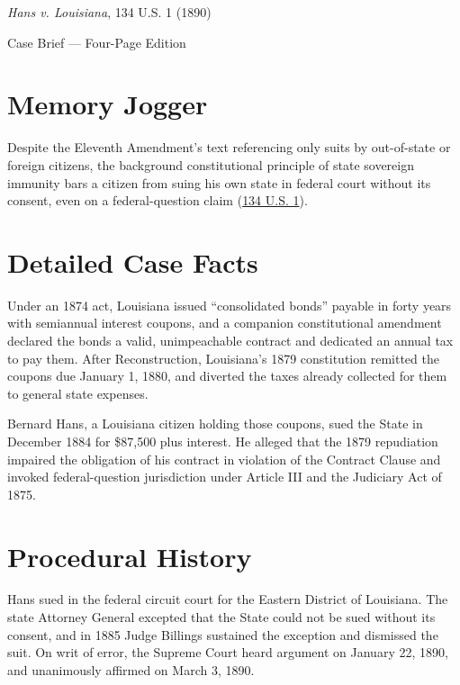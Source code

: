 \documentclass[12pt]{article}
\begin{document}
\begin{center}
{\LARGE \textit{Hans v. Louisiana}, 134 U.S. 1 (1890)\par}
\vspace{0.8em}
{\large Case Brief --- Four-Page Edition\par}
\end{center}
\vspace{1em}

\section{Memory Jogger}

Despite the Eleventh Amendment's text referencing only suits by out-of-state or foreign citizens, the background constitutional principle of state sovereign immunity bars a citizen from suing his own state in federal court without its consent, even on a federal-question claim (\href{https://supreme.justia.com/cases/federal/us/134/1/}{134 U.S. 1}).

\section{Detailed Case Facts}

Under an 1874 act, Louisiana issued ``consolidated bonds'' payable in forty years with semiannual interest coupons, and a companion constitutional amendment declared the bonds a valid, unimpeachable contract and dedicated an annual tax to pay them. After Reconstruction, Louisiana's 1879 constitution remitted the coupons due January 1, 1880, and diverted the taxes already collected for them to general state expenses.

Bernard Hans, a Louisiana citizen holding those coupons, sued the State in December 1884 for \$87,500 plus interest. He alleged that the 1879 repudiation impaired the obligation of his contract in violation of the Contract Clause and invoked federal-question jurisdiction under Article III and the Judiciary Act of 1875.

\section{Procedural History}

Hans sued in the federal circuit court for the Eastern District of Louisiana. The state Attorney General excepted that the State could not be sued without its consent, and in 1885 Judge Billings sustained the exception and dismissed the suit. On writ of error, the Supreme Court heard argument on January 22, 1890, and unanimously affirmed on March 3, 1890.
\end{document}
